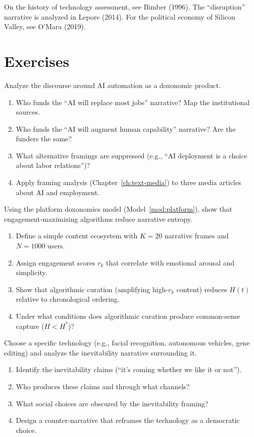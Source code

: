 On the history of technology assessment, see Bimber (1996).
The ``disruption'' narrative is analyzed in Lepore (2014).
For the political economy of Silicon Valley, see O'Mara (2019).

\section{Exercises}

\begin{exercise}
Analyze the discourse around AI automation as a doxonomic product.
\begin{enumerate}[nosep]
  \item Who funds the ``AI will replace most jobs'' narrative? Map the institutional sources.
  \item Who funds the ``AI will augment human capability'' narrative? Are the funders the same?
  \item What alternative framings are suppressed (e.g., ``AI deployment is a choice about labor relations'')?
  \item Apply framing analysis (Chapter~\ref{ch:text-media}) to three media articles about AI and employment.
\end{enumerate}
\end{exercise}

\begin{exercise}
Using the platform doxonomics model (Model~\ref{mod:platform}), show that engagement-maximizing algorithms reduce narrative entropy.
\begin{enumerate}[nosep]
  \item Define a simple content ecosystem with $K = 20$ narrative frames and $N = 1000$ users.
  \item Assign engagement scores $r_k$ that correlate with emotional arousal and simplicity.
  \item Show that algorithmic curation (amplifying high-$r_k$ content) reduces $H(t)$ relative to chronological ordering.
  \item Under what conditions does algorithmic curation produce common-sense capture ($H < H^*$)?
\end{enumerate}
\end{exercise}

\begin{exercise}
Choose a specific technology (e.g., facial recognition, autonomous vehicles, gene editing) and analyze the inevitability narrative surrounding it.
\begin{enumerate}[nosep]
  \item Identify the inevitability claims (``it's coming whether we like it or not'').
  \item Who produces these claims and through what channels?
  \item What social choices are obscured by the inevitability framing?
  \item Design a counter-narrative that reframes the technology as a democratic choice.
\end{enumerate}
\end{exercise}

